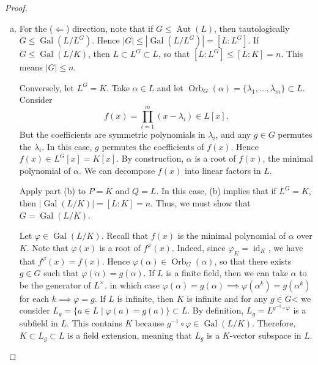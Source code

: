 \documentclass[10pt,letterpaper,cm]{nupset}
\theoremstyle{definition}
\newcommand{\1}{\mathbf{1}}
\newcommand{\0}{\vec 0}
\DeclareMathOperator{\id}{id}
\DeclareMathOperator{\gal}{Gal}
\DeclareMathOperator{\aut}{Aut}
\DeclareMathOperator{\orb}{Orb}
\begin{document}
\begin{proof} $ $
\begin{enumerate}[(a)]
\item For the ($\Longleftarrow$) direction, note that if $G \leq \aut(L)$, then tautologically $G \leq \gal(L/L^G)$. Hence $|G| \leq |\gal(L/L^G)| = [L: L^G]$. If $G \leq \gal(L/K)$, then $L \subset L^G \subset L$, so that $[L:L^G]\leq [L:K] =n$. This means $|G|\leq n$.

Conversely, let $L^G =K$.  Take $\alpha \in L$ and let $\orb_G(\alpha) = \{\lambda_1, \ldots, \lambda_m\} \subset L$. Consider $$f(x) = \prod_{i=1}^m (x-\lambda_i) \in L[x].$$ But the coefficients are symmetric polynomials in $\lambda_i$, and any $g\in G$ permutes the $\lambda_i$. In this case, $g$ permutes the coefficients of $f(x)$. Hence $f(x) \in L^G[x] = K[x]$. By construction, $\alpha$ is a root of $f(x)$, the minimal polynomial of $\alpha$.  We can decompose $f(x)$ into linear factors in $L$.

Apply part (b) to $P = K$ and $Q=L$. In this case, (b) implies that if $L^G=K$, then $\lvert{\gal(L/K)}\rvert = [L:K]=n$. Thus, we must show that $G = \gal(L/K)$.

Let $\varphi \in \gal(L/K)$. Recall that $f(x)$ is the minimal polynomial of $\alpha$ over $K$. Note that $\varphi(x)$ is a root of $f^{\varphi}(x)$. Indeed, since $\varphi_K = \id_K$, we have that $f^{\varphi}(x) = f(x)$. Hence $\varphi(\alpha) \in \orb_G(\alpha)$, so that there exists $g\in G$ such that $\varphi(\alpha) = g(\alpha)$. If $L$ is a finite field, then we can take $\alpha$ to be the generator of $L^{\times}$. in which case $\varphi(\alpha) = g(\alpha) \implies \varphi(\alpha^k)= g(\alpha^k)$ for each $k \implies \varphi = g.$ If $L$ is infinite, then $K$ is infinite and for any $g\in G$< we consider $L_g = \{a\in L \mid \varphi(a) = g(a)\}\subset L$. By definition, $L_g = L^{g^{-1}\circ \varphi}$ is a subfield in $L$. This contains $K$ because $g^{-1}\circ \varphi \in \gal(L/K)$. Therefore, $K\subset L_g \subset L$ is a field extension, meaning that $L_g$ is a $K$-vector subspace in $L$.


\end{enumerate}
\end{proof}
\end{document}

